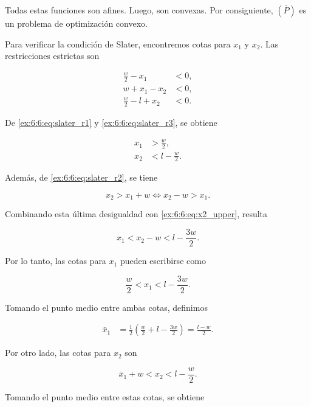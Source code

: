 \begin{enumerate}
Todas estas funciones son afines. Luego, son convexas. Por consiguiente, $(\bar P)$ es un problema de optimización convexo.

Para verificar la condición de Slater, encontremos cotas para $x_1$ y $x_2$. 
Las restricciones estrictas son

\begin{align}
\frac{w}{2}-x_1 &< 0, \label{ex:6:6:eq:slater_r1}\\
w+x_1-x_2 &< 0, \label{ex:6:6:eq:slater_r2}\\
\frac{w}{2}-l+x_2 &< 0. \label{ex:6:6:eq:slater_r3}
\end{align}

De \eqref{ex:6:6:eq:slater_r1} y \eqref{ex:6:6:eq:slater_r3}, se obtiene

\begin{align}
x_1 &> \frac{w}{2}, \label{ex:6:6:eq:x1_lower}\\
x_2 &< l-\frac{w}{2}. \label{ex:6:6:eq:x2_upper}
\end{align}

Además, de \eqref{ex:6:6:eq:slater_r2}, se tiene

\begin{equation}
x_2>x_1+w \Leftrightarrow
x_2-w>x_1.
\end{equation}

Combinando esta última desigualdad con \eqref{ex:6:6:eq:x2_upper}, resulta

\begin{equation}
x_1<x_2-w<l-\frac{3w}{2}.
\end{equation}

Por lo tanto, las cotas para $x_1$ pueden escribirse como

\begin{equation}
\frac{w}{2}<x_1<l-\frac{3w}{2}.
\end{equation}

Tomando el punto medio entre ambas cotas, definimos

\begin{align}
\bar{x}_1
&=
\frac{1}{2}
\left(
\frac{w}{2}
+
l-\frac{3w}{2}
\right)=
\frac{l-w}{2}.
\end{align}

Por otro lado, las cotas para $x_2$ son

\begin{equation}
\bar{x}_1+w<x_2<l-\frac{w}{2}.
\end{equation}

Tomando el punto medio entre estas cotas, se obtiene


\end{enumerate}
